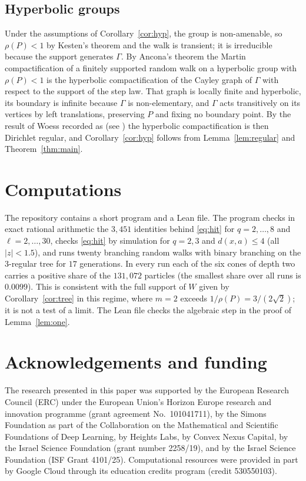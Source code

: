 \documentclass[11pt]{amsart}
\theoremstyle{definition}
\theoremstyle{remark}
\numberwithin{equation}{section}
\newcommand{\1}{\mathbf 1}
\begin{document}
\subsection{Hyperbolic groups}
Under the assumptions of Corollary~\ref{cor:hyp}, the group is non-amenable, so $\rho(P)<1$ by Kesten's theorem and the walk is transient; it is irreducible because the support generates $\Gamma$. By Ancona's theorem \cite{An1,An2} the Martin compactification of a finitely supported random walk on a hyperbolic group with $\rho(P)<1$ is the hyperbolic compactification of the Cayley graph of $\Gamma$ with respect to the support of the step law. That graph is locally finite and hyperbolic, its boundary is infinite because $\Gamma$ is non-elementary, and $\Gamma$ acts transitively on its vertices by left translations, preserving $P$ and fixing no boundary point. By the result of Woess recorded as \cite[Proposition~3.38]{KW} (see \cite{Woe93}) the hyperbolic compactification is then Dirichlet regular, and Corollary~\ref{cor:hyp} follows from Lemma~\ref{lem:regular} and Theorem~\ref{thm:main}.

\section{Computations}

The repository \cite{code} contains a short program and a Lean file. The program checks in exact rational arithmetic the $3{,}451$ identities behind \eqref{eq:hit} for $q=2,\dots,8$ and $\ell=2,\dots,30$, checks \eqref{eq:hit} by simulation for $q=2,3$ and $d(x,a)\le4$ (all $|z|<1.5$), and runs twenty branching random walks with binary branching on the $3$-regular tree for $17$ generations. In every run each of the six cones of depth two carries a positive share of the $131{,}072$ particles (the smallest share over all runs is $0.0099$). This is consistent with the full support of $W$ given by Corollary~\ref{cor:tree} in this regime, where $m=2$ exceeds $1/\rho(P)=3/(2\sqrt2)$; it is not a test of a limit. The Lean file checks the algebraic step in the proof of Lemma~\ref{lem:one}.

\section*{Acknowledgements and funding}
The research presented in this paper was supported by the European Research
Council (ERC) under the European Union's Horizon Europe research and
innovation programme (grant agreement No.~101041711), by the Simons
Foundation as part of the Collaboration on the Mathematical and Scientific
Foundations of Deep Learning, by Heights Labs, by Convex Nexus Capital, by
the Israel Science Foundation (grant number 2258/19), and by the Israel
Science Foundation (ISF Grant 4101/25). Computational resources were
provided in part by Google Cloud through its education credits program
(credit 530550103).
\end{document}
